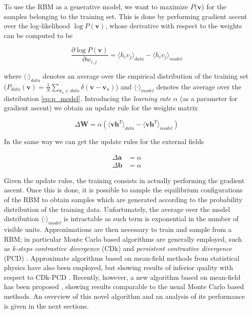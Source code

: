 \documentclass{revtex4-1}
\begin{document}
To use the RBM as a generative model, we want to maximize \(P(\textbf{v}\)) for the samples belonging to the training set. This is done by performing gradient ascent over the log-likelihood \(\log P(\textbf{v})\), whose derivative with respect to the weights can be computed to be

\begin{equation*}
\frac{\partial \log P(\textbf{v})}{\partial w_{i,j}} = \langle h_i v_j \rangle_{data} - \langle h_i v_j \rangle_{model}
\end{equation*}

where \(\langle \cdot \rangle_{data}\) denotes an average over the empirical distribution of the training set (\( \textstyle P_{data}(\mathbf{v}) = \frac{1}{N} \sum_{\mathbf{v}_n \in data} \delta (\mathbf{v} - \mathbf{v}_n ) \)) and 
\(\langle \cdot \rangle_{model}\) denotes the average over the distribution \eqref{eq:p_model}. Introducing the \textit{learning rate} \(\alpha \) (as a parameter for gradient ascent) we obtain an update rule for the weights matrix

\begin{equation}
\Delta \mathbf{W} = \alpha \left( \langle \mathbf{v h}^T \rangle_{data} - \langle \mathbf{v h}^T \rangle_{model} \right)
\label{eq:w_up}
\end{equation}

In the same way we can get the update rules for the external fields

\begin{align}
\Delta \mathbf{a} &= \alpha \\
\Delta \mathbf{b} &= \alpha
\end{align}

Given the update rules, the training consists in actually performing the gradient ascent. Once this is done, it is possible to sample the equilibrium configurations of the RBM to obtain samples which are generated according to the probability distribution of the training data. Unfortunately, the average over the model distribution \(\textstyle \langle \cdot \rangle_{model}\) is intractable as such term is exponential in the number of visible units. Approximations are then necessary to train and sample from a RBM; in particular Monte Carlo based algorithms are generally employed, such as \textit{k-steps contrastive divergence} (CDk) \cite{Hinton_CD}  and \textit{persistent contrastive divergence} (PCD) \cite{PCD}. Approximate algorithms based on mean-field methods from statistical physics have also been employed, but showing results of inferior quality with respect to CDk-PCD \cite{PCD}. Recently, however, a new algorithm based on mean-field has been proposed \cite{PCD}, showing results comparable to the usual Monte Carlo based methods. An overview of this novel algorithm and an analysis of its performance is given in the next sections.
\end{document}
